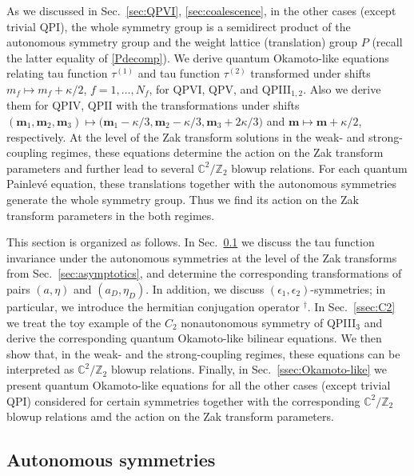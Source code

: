 \documentclass[12pt,a4paper]{article}
\numberwithin{equation}{section}
\newcommand{\D}{\scriptscriptstyle{D}}
\begin{document}
As we discussed in Sec.~\ref{sec:QPVI}, \ref{sec:coalescence}, in the other cases (except trivial QPI), the whole symmetry group is a semidirect product of the autonomous symmetry group and the weight lattice (translation) group $P$ (recall the latter equality of \eqref{Pdecomp}). We derive quantum Okamoto-like equations relating tau function $\tau^{(1)}$ and tau function $\tau^{(2)}$ transformed under shifts $m_f\mapsto m_f+\kappa/2$, $f=1,\ldots,N_f$, for QPVI, QPV, and QPIII$_{1,2}$. Also we derive them for QPIV, QPII with the transformations under shifts $(\boldsymbol{m}_1,\boldsymbol{m}_2,\boldsymbol{m}_3)\mapsto\big(\boldsymbol{m}_1{-}\kappa/3,\boldsymbol{m}_2{-}\kappa/3,\boldsymbol{m}_3{+}2\kappa/3\big)$ and $\boldsymbol{m}\mapsto\boldsymbol{m}{+}\kappa/2$, respectively. At the level of the Zak transform solutions in the weak- and strong-coupling regimes, these equations determine the action on the Zak transform parameters and further lead to several $\mathbb{C}^2/\mathbb{Z}_2$ blowup relations. For each quantum Painlev\'e equation, these translations together with the autonomous symmetries generate the whole symmetry group. Thus we find its action on the Zak transform parameters in the both regimes.

This section is organized as follows. In Sec.~\ref{ssec:aut_symm} we discuss the tau function invariance under the autonomous symmetries at the level of the Zak transforms from Sec.~\ref{sec:asymptotics}, and determine the corresponding transformations of pairs $(a,\eta)$ and $(a_{\D},\eta_{\D})$. In addition, we discuss $(\epsilon_1,\epsilon_2)$-symmetries; in particular, we introduce the hermitian conjugation operator $^\dagger$. In Sec.~\ref{ssec:C2} we treat the toy example of the $C_2$ nonautonomous symmetry of QPIII$_3$ and derive the corresponding quantum Okamoto-like bilinear equations. We then show that, in the weak- and the strong-coupling regimes, these equations can be interpreted as $\mathbb{C}^2/\mathbb{Z}_2$ blowup relations. Finally, in Sec.~\ref{ssec:Okamoto-like}
we present quantum Okamoto-like equations for all the other cases (except trivial QPI) considered for certain symmetries
together with the corresponding $\mathbb{C}^2/\mathbb{Z}_2$ blowup relations amd the action on the Zak transform parameters.

\subsection{Autonomous symmetries}
\label{ssec:aut_symm}
\end{document}
